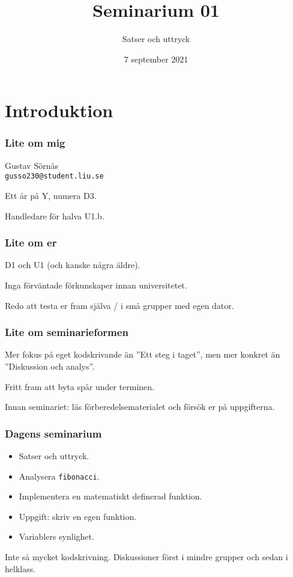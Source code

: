 \documentclass{beamer}
\title{Seminarium 01}
\subtitle{Satser och uttryck}
\date{7 september 2021}
\begin{document}
  \frame{\titlepage}

  \section*{Introduktion}

  \begin{frame}
    \frametitle{Lite om mig}

    Gustav Sörnäs \\
    \texttt{gusso230@student.liu.se}

    Ett år på Y, numera D3.

    Handledare för halva U1.b.

  \end{frame}

  \begin{frame}
    \frametitle{Lite om er}

    D1 och U1 (och kanske några äldre).

    Inga förväntade förkunskaper innan universitetet.

    Redo att testa er fram själva / i små grupper med egen dator.

  \end{frame}

  \begin{frame}
    \frametitle{Lite om seminarieformen}

    Mer fokus på eget kodskrivande än ''Ett steg i taget'', men mer konkret än
    ''Diskussion och analys''.

    Fritt fram att byta spår under terminen.

    Innan seminariet: läs förberedelsematerialet och försök er på uppgifterna.

  \end{frame}

  \begin{frame}
    \frametitle{Dagens seminarium}

    \begin{itemize}
      \item Satser och uttryck.
      \item Analysera \texttt{fibonacci}.
      \item Implementera en matematiskt definerad funktion.
      \item Uppgift: skriv en egen funktion.
      \item Variablers synlighet.
    \end{itemize}

    Inte så mycket kodskrivning. Diskussioner först i mindre grupper och sedan i
    helklass.

  \end{frame}
\end{document}
